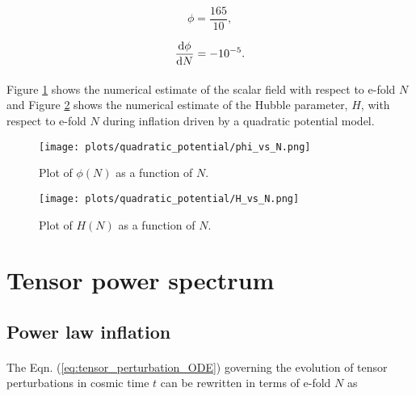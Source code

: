 \documentclass[12pt,a4paper,oneside]{book}
\begin{document}
\begin{equation}
\phi = \frac{165}{10},
\end{equation}

\begin{equation}
\frac{{\rm d}\phi}{{\rm d}N} = -10^{-5}.
\end{equation}

\paragraph*{} Figure \ref{fig:field_vs_N_quad} shows the numerical estimate of the scalar 
field with respect to e-fold $N$ and Figure \ref{fig:Hubble_vs_N_quad} shows the numerical 
estimate of the Hubble parameter, $H$, with respect to e-fold $N$ during inflation 
driven by a quadratic potential model.

\begin{figure}
\begin{center}
\texttt{[image: plots/quadratic\_potential/phi\_vs\_N.png]}
\caption[Plot of $\phi(N)$ as a function of $N$ in quadratic potential model.]
{Plot of $\phi(N)$ as a function of $N$.}
\label{fig:field_vs_N_quad}
\end{center}
\end{figure}

\begin{figure}
\begin{center}
\texttt{[image: plots/quadratic\_potential/H\_vs\_N.png]}
\caption[Plot of $H(N)$ as a function of $N$ in quadratic potential model.]
{Plot of $H(N)$ as a function of $N$.}
\label{fig:Hubble_vs_N_quad}
\end{center}
\end{figure}

\section{Tensor power spectrum}

\subsection{Power law inflation}

\paragraph*{} The Eqn. (\ref{eq:tensor_perturbation_ODE}) governing the evolution 
of tensor perturbations in cosmic time $t$ can be rewritten in terms of e-fold $N$ as 
\end{document}
